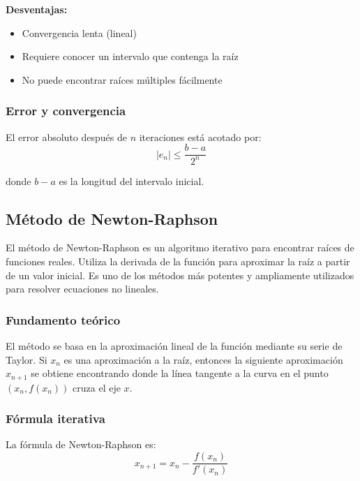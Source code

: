 \documentclass[12pt,a4paper]{article}
\begin{document}
\textbf{Desventajas:}
\begin{itemize}
    \item Convergencia lenta (lineal)
    \item Requiere conocer un intervalo que contenga la raíz
    \item No puede encontrar raíces múltiples fácilmente
\end{itemize}

\subsubsection{Error y convergencia}

El error absoluto después de $n$ iteraciones está acotado por:
\begin{equation}
    |e_n| \leq \frac{b - a}{2^n}
\end{equation}

donde $b - a$ es la longitud del intervalo inicial.

\subsection{Método de Newton-Raphson}

El método de Newton-Raphson es un algoritmo iterativo para encontrar raíces de funciones reales. Utiliza la derivada de la función para aproximar la raíz a partir de un valor inicial. Es uno de los métodos más potentes y ampliamente utilizados para resolver ecuaciones no lineales.

\subsubsection{Fundamento teórico}

El método se basa en la aproximación lineal de la función mediante su serie de Taylor. Si $x_n$ es una aproximación a la raíz, entonces la siguiente aproximación $x_{n+1}$ se obtiene encontrando donde la línea tangente a la curva en el punto $(x_n, f(x_n))$ cruza el eje $x$.

\subsubsection{Fórmula iterativa}

La fórmula de Newton-Raphson es:
\begin{equation}
    x_{n+1} = x_n - \frac{f(x_n)}{f'(x_n)}
\end{equation}
\end{document}
